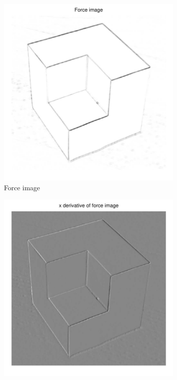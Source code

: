 \documentclass[11pt,a4paper]{article}
\begin{document}
\begin{figure}[H]
\begin{subfigure}[t]{0.48\textwidth}
        \includegraphics[width=\textwidth]{src/images/cubic_forces.pdf}
        \caption{Force image}
        \label{fig:cubic_forces}
    \end{subfigure}
    \begin{subfigure}[t]{0.48\textwidth}
        \includegraphics[width=\textwidth]{src/images/cubic_xforces.pdf}

\end{subfigure}
\end{figure}
\end{document}
